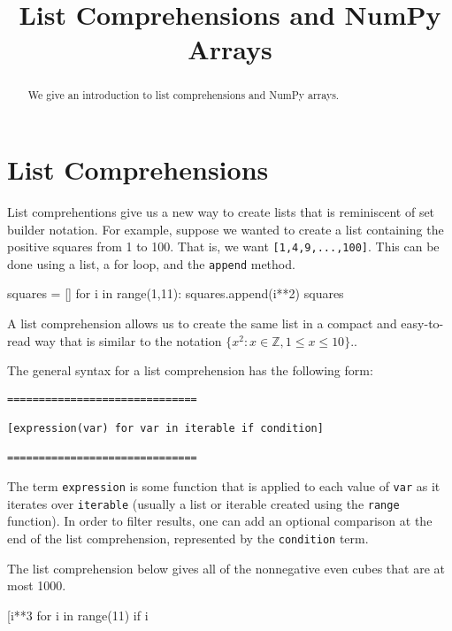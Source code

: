 \documentclass{ximera}
\title{List Comprehensions and NumPy Arrays}
\begin{document}
  
\begin{abstract}  
We give an introduction to list comprehensions and NumPy arrays.
\end{abstract}  
\maketitle

\section{List Comprehensions}

List comprehentions give us a new way to create lists that is reminiscent of set builder notation. For example, suppose we wanted to create a list containing the positive squares from 1 to 100. That is, we want \verb|[1,4,9,...,100]|. This can be done using a list, a for loop, and the \verb|append| method.

\begin{sageCell}
squares = []
for i in range(1,11):
        squares.append(i**2)
squares
\end{sageCell}

A list comprehension allows us to create the same list in a compact and easy-to-read way that is similar to the notation $\{x^2:x\in\mathbb{Z},1\leq x\leq 10\}$..

\begin{sageCell}
\end{sageCell}

The general syntax for a list comprehension has the following form:

\begin{verbatim}
==============================

[expression(var) for var in iterable if condition]

==============================
\end{verbatim}

The term \verb|expression| is some function that is applied to each value of \verb|var| as it iterates over \verb|iterable| (usually a list or iterable created using the \verb|range| function). In order to filter results, one can add an optional comparison at the end of the list comprehension, represented by the \verb|condition| term.

The list comprehension below gives all of the nonnegative even cubes that are at most 1000.

\begin{sageCell}
[i**3 for i in range(11) if i%
\end{sageCell}
\end{document}
